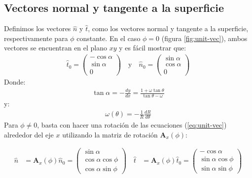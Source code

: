 \subsection{Vectores normal y tangente a la superficie}

Definimos los vectores $\hat{n}$ y $\hat{t}$, como los vectores normal y tangente a la superficie, respectivamente para $\phi$ constante. En el caso $\phi = 0$ (figura \ref{fig:unit-vec}), ambos vectores se encuentran en el plano $xy$ y es fácil mostrar que:
\begin{align}
  \hat{t}_0 =
  \left(
  \begin{array}{c}
    -\cos\alpha \\
    \sin\alpha \\
    0
  \end{array}
  \right)
  \quad \mathrm{y} \quad
  \hat{n}_0 =
  \left(
  \begin{array}{c}
    \sin\alpha \\
    \cos\alpha \\
    0
  \end{array}
  \right)
  \label{eq:unit-vec}
\end{align}
Donde:
\begin{align}
  \tan\alpha = -\frac{dy}{dx} = \frac{1+\omega\tan\theta}{\tan\theta-\omega} \label{eq:tan-alpha}
\end{align}
y:
\begin{align}
  \omega(\theta) = -\frac{1}{R}\frac{dR}{d\theta} 
\end{align}
Para $\phi \neq 0$, basta con hacer una rotación de las ecuaciones (\ref{eq:unit-vec}) alrededor del eje $x$ utilizando la matriz de rotación $\mathbf{A}_x(\phi)$:

\begin{align}
  \hat{n} &= \mathbf{A}_x(\phi)\hat{n}_0 =
 \left(
  \begin{array}{c}
    \sin\alpha \\
    \cos\alpha\cos\phi \\
    \cos\alpha\sin\phi
  \end{array}
  \right) \quad
    \hat{t} &= \mathbf{A}_x(\phi)\hat{t}_0 =
 \left(
  \begin{array}{c}
    -\cos\alpha \\
    \sin\alpha\cos\phi \\
    \sin\alpha\sin\phi
  \end{array}
  \right)
\end{align}

